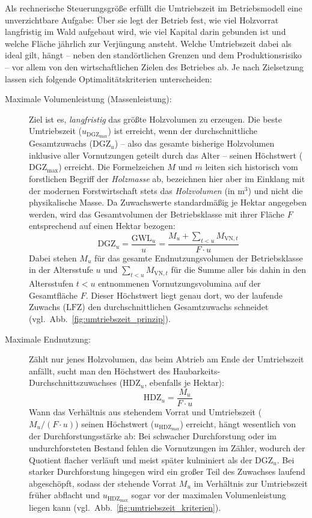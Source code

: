 \documentclass[twocolumn, paper=a4, fontsize=10pt]{scrartcl}
\begin{document}
Als rechnerische Steuerungsgröße erfüllt die Umtriebszeit im Betriebsmodell eine unverzichtbare Aufgabe: Über sie legt der Betrieb fest, wie viel Holzvorrat langfristig im Wald aufgebaut wird, wie viel Kapital darin gebunden ist und welche Fläche jährlich zur Verjüngung ansteht. Welche Umtriebszeit dabei als ideal gilt, hängt -- neben den standörtlichen Grenzen und dem Produktionsrisiko -- vor allem von den wirtschaftlichen Zielen des Betriebes ab. Je nach Zielsetzung lassen sich folgende Optimalitätskriterien unterscheiden:
\begin{description}
\item[Maximale Volumenleistung (Massenleistung):] Ziel ist es, \emph{langfristig} das größte Holzvolumen zu erzeugen. Die beste Umtriebszeit ($u_{\text{DGZ}_{\max}}$) ist erreicht, wenn der durchschnittliche Gesamtzuwachs ($\text{DGZ}_u$) -- also das gesamte bisherige Holzvolumen inklusive aller Vornutzungen geteilt durch das Alter -- seinen Höchstwert ($\text{DGZ}_{\max}$) erreicht. Die Formelzeichen $M$ und $m$ leiten sich historisch vom forstlichen Begriff der \emph{Holzmasse} ab, bezeichnen hier aber im Einklang mit der modernen Forstwirtschaft stets das \emph{Holzvolumen} (in $\text{m}^3$) und nicht die physikalische Masse. Da Zuwachswerte standardmäßig je Hektar angegeben werden, wird das Gesamtvolumen der Betriebsklasse mit ihrer Fläche $F$ entsprechend auf einen Hektar bezogen:
  \begin{equation}
    \text{DGZ}_u = \frac{\text{GWL}_u}{u} = \frac{M_u + \sum_{t < u} M_{\text{VN},t}}{F \cdot u}
  \end{equation}
  Dabei stehen $M_u$ für das gesamte Endnutzungsvolumen der Betriebsklasse in der Altersstufe $u$ und $\sum_{t < u} M_{\text{VN},t}$ für die Summe aller bis dahin in den Altersstufen $t < u$ entnommenen Vornutzungsvolumina auf der Gesamtfläche $F$. Dieser Höchstwert liegt genau dort, wo der laufende Zuwachs ($\text{LFZ}$) den durchschnittlichen Gesamtzuwachs schneidet (vgl.\ Abb.~\ref{fig:umtriebszeit_prinzip}).

\item[Maximale Endnutzung:] Zählt nur jenes Holzvolumen, das beim Abtrieb am Ende der Umtriebszeit anfällt, sucht man den Höchstwert des Haubarkeits-Durchschnittszuwachses ($\text{HDZ}_u$, ebenfalls je Hektar):
  \begin{equation}
    \text{HDZ}_u = \frac{M_u}{F \cdot u}
  \end{equation}
  Wann das Verhältnis aus stehendem Vorrat und Umtriebszeit ($M_u / (F \cdot u)$) seinen Höchstwert ($u_{\text{HDZ}_{\max}}$) erreicht, hängt wesentlich von der Durchforstungsstärke ab: Bei schwacher Durchforstung oder im undurchforsteten Bestand fehlen die Vornutzungen im Zähler, wodurch der Quotient flacher verläuft und meist später kulminiert als der $\text{DGZ}_u$. Bei starker Durchforstung hingegen wird ein großer Teil des Zuwachses laufend abgeschöpft, sodass der stehende Vorrat $M_u$ im Verhältnis zur Umtriebszeit früher abflacht und $u_{\text{HDZ}_{\max}}$ sogar vor der maximalen Volumenleistung liegen kann (vgl.\ Abb.~\ref{fig:umtriebszeit_kriterien}).


\end{description}
\end{document}
